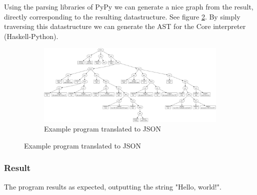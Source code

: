 Using the parsing libraries of PyPy we can generate a nice graph from the result,
directly corresponding to the resulting datastructure. 
See figure \ref{fig:helloworldgraph}.
By simply traversing this datastructure we can generate the AST for the Core 
interpreter (Haskell-Python).

\begin{figure}
\begin{figure}[H]
\includegraphics[width=\textwidth]{../interpreter/tests/helloworld.png}
\caption{Example program translated to JSON}
\label{fig:helloworldgraph}
\end{figure}
\end{figure}

\subsubsection{Result}

The program results as expected, outputting the string "Hello, world!".

